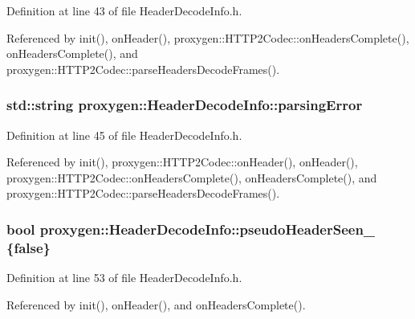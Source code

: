 Definition at line 43 of file Header\+Decode\+Info.\+h.



Referenced by init(), on\+Header(), proxygen\+::\+H\+T\+T\+P2\+Codec\+::on\+Headers\+Complete(), on\+Headers\+Complete(), and proxygen\+::\+H\+T\+T\+P2\+Codec\+::parse\+Headers\+Decode\+Frames().

\subsubsection[{parsing\+Error}]{\setlength{\rightskip}{0pt plus 5cm}std\+::string proxygen\+::\+Header\+Decode\+Info\+::parsing\+Error}\label{classproxygen_1_1HeaderDecodeInfo_ab2b5405e0ba8df58913f00a254861e3f}


Definition at line 45 of file Header\+Decode\+Info.\+h.



Referenced by init(), proxygen\+::\+H\+T\+T\+P2\+Codec\+::on\+Header(), on\+Header(), proxygen\+::\+H\+T\+T\+P2\+Codec\+::on\+Headers\+Complete(), on\+Headers\+Complete(), and proxygen\+::\+H\+T\+T\+P2\+Codec\+::parse\+Headers\+Decode\+Frames().

\subsubsection[{pseudo\+Header\+Seen\+\_\+}]{\setlength{\rightskip}{0pt plus 5cm}bool proxygen\+::\+Header\+Decode\+Info\+::pseudo\+Header\+Seen\+\_\+ \{false\}\hspace{0.3cm}{\ttfamily [private]}}\label{classproxygen_1_1HeaderDecodeInfo_ab057dcf3b4aba361a1b16b24763fdffa}


Definition at line 53 of file Header\+Decode\+Info.\+h.



Referenced by init(), on\+Header(), and on\+Headers\+Complete().

